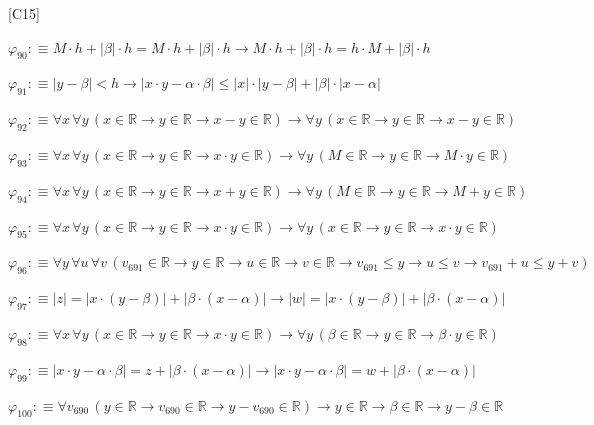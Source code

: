 \begin{fullproof}{[C15]}
\begin{abbrevlist}
\item $\varphi_{90} :\equiv M \cdot h + \lvert \beta \rvert \cdot h = M \cdot h + \lvert \beta \rvert \cdot h \to M \cdot h + \lvert \beta \rvert \cdot h = h \cdot M + \lvert \beta \rvert \cdot h$
\item $\varphi_{91} :\equiv \lvert y - \beta \rvert < h \to \lvert x \cdot y - \alpha \cdot \beta \rvert \leq \lvert x \rvert \cdot \lvert y - \beta \rvert + \lvert \beta \rvert \cdot \lvert x - \alpha \rvert$
\item $\varphi_{92} :\equiv \forall x\,\forall y\,(x \in \mathbb{R} \to y \in \mathbb{R} \to x - y \in \mathbb{R}) \to \forall y\,(x \in \mathbb{R} \to y \in \mathbb{R} \to x - y \in \mathbb{R})$
\item $\varphi_{93} :\equiv \forall x\,\forall y\,(x \in \mathbb{R} \to y \in \mathbb{R} \to x \cdot y \in \mathbb{R}) \to \forall y\,(M \in \mathbb{R} \to y \in \mathbb{R} \to M \cdot y \in \mathbb{R})$
\item $\varphi_{94} :\equiv \forall x\,\forall y\,(x \in \mathbb{R} \to y \in \mathbb{R} \to x + y \in \mathbb{R}) \to \forall y\,(M \in \mathbb{R} \to y \in \mathbb{R} \to M + y \in \mathbb{R})$
\item $\varphi_{95} :\equiv \forall x\,\forall y\,(x \in \mathbb{R} \to y \in \mathbb{R} \to x \cdot y \in \mathbb{R}) \to \forall y\,(x \in \mathbb{R} \to y \in \mathbb{R} \to x \cdot y \in \mathbb{R})$
\item $\varphi_{96} :\equiv \forall y\,\forall u\,\forall v\,(v_{691} \in \mathbb{R} \to y \in \mathbb{R} \to u \in \mathbb{R} \to v \in \mathbb{R} \to v_{691} \leq y \to u \leq v \to v_{691} + u \leq y + v)$
\item $\varphi_{97} :\equiv \lvert z \rvert = \lvert x \cdot (y - \beta) \rvert + \lvert \beta \cdot (x - \alpha) \rvert \to \lvert w \rvert = \lvert x \cdot (y - \beta) \rvert + \lvert \beta \cdot (x - \alpha) \rvert$
\item $\varphi_{98} :\equiv \forall x\,\forall y\,(x \in \mathbb{R} \to y \in \mathbb{R} \to x \cdot y \in \mathbb{R}) \to \forall y\,(\beta \in \mathbb{R} \to y \in \mathbb{R} \to \beta \cdot y \in \mathbb{R})$
\item $\varphi_{99} :\equiv \lvert x \cdot y - \alpha \cdot \beta \rvert = z + \lvert \beta \cdot (x - \alpha) \rvert \to \lvert x \cdot y - \alpha \cdot \beta \rvert = w + \lvert \beta \cdot (x - \alpha) \rvert$
\item $\varphi_{100} :\equiv \forall v_{690}\,(y \in \mathbb{R} \to v_{690} \in \mathbb{R} \to y - v_{690} \in \mathbb{R}) \to y \in \mathbb{R} \to \beta \in \mathbb{R} \to y - \beta \in \mathbb{R}$

\end{abbrevlist}
\end{fullproof}
